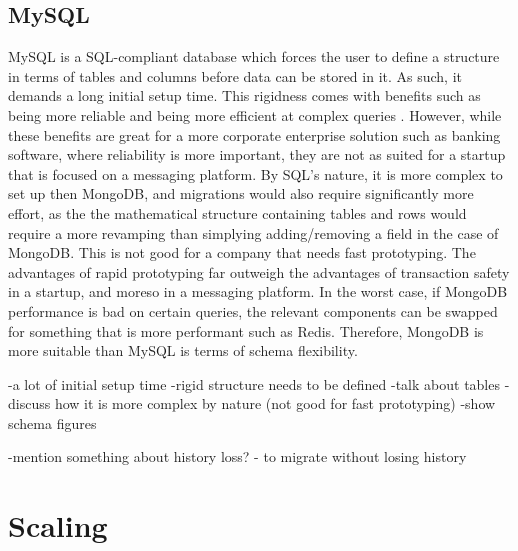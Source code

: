 \documentclass[12pt]{article}
\begin{document}
\subsection{MySQL}
MySQL is a SQL-compliant database which forces the user to define a structure in terms of tables and columns before data can be stored in it. As such, it demands a long initial setup time. This rigidness comes with benefits such as being more reliable and being more efficient at complex queries \cite{sql_vs_nosql}. However, while these benefits are great for a more corporate enterprise solution such as banking software, where reliability is more important, they are not as suited for a startup that is focused on a messaging platform. By SQL's nature, it is more complex to set up then MongoDB, and migrations would also require significantly more effort, as the the mathematical structure containing tables and rows would require a more revamping than simplying adding/removing a field in the case of MongoDB. This is not good for a company that needs fast prototyping. The advantages of rapid prototyping far outweigh the advantages of transaction safety in a startup, and moreso in a messaging platform. In the worst case, if MongoDB performance is bad on certain queries, the relevant components can be swapped for something that is more performant such as Redis. Therefore, MongoDB is more suitable than MySQL is terms of schema flexibility.

-a lot of initial setup time
-rigid structure needs to be defined
-talk about tables
-discuss how it is more complex by nature (not good for fast prototyping)
-show schema figures

-mention something about history loss? - to migrate without losing history

\section{Scaling}
\end{document}
